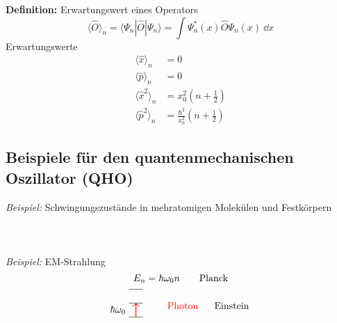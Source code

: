 \noindent
\textbf{Definition:} Erwartungswert eines Operators
\begin{equation*}
\langle \hat{O} \rangle_n = \langle \Psi_n | \hat{O} | \Psi_n \rangle = \int \Psi^*_n(x) \hat{O} \Psi_n(x) \ \dd x
\end{equation*}
Erwartungswerte
\begin{align*}
\langle \hat{x} \rangle_n &= 0\\
\langle \hat{p} \rangle_n &= 0\\
\langle \hat{x}^2 \rangle_n &= x_0^2 \left(n + \frac{1}{2}\right)\\
\langle \hat{p}^2 \rangle_n &= \frac{\hbar^2}{x_0^2} \left(n + \frac{1}{2}\right)
\end{align*}

\subsection{Beispiele für den quantenmechanischen Oszillator (QHO)}

\emph{Beispiel:} Schwingungszustände in mehratomigen Molekülen und Festkörpern\\
\\
\\
\\[5pt]
\emph{Beispiel:} EM-Strahlung
\begin{equation*}
E_n = \hbar \omega_0 n \qquad \textrm{Planck}
\end{equation*}
\vspace{3pt}
\begin{equation*}
\begin{tikzpicture}[scale=.5]
	\foreach \y in {0, 1, 2}
	\draw (0,\y) -- ++(1,0);
	\node[left] at (0,.5) {$ \hbar \omega_0 $};
	\draw[thick,red,->] (.5,0) -- (.5,1);
\end{tikzpicture}
\qquad 
\begin{array}{c}
\tx{\color{red} Photon \color{black} $ \quad $ Einstein}\\[5pt]
\phantom{0}
\end{array}
\end{equation*}

